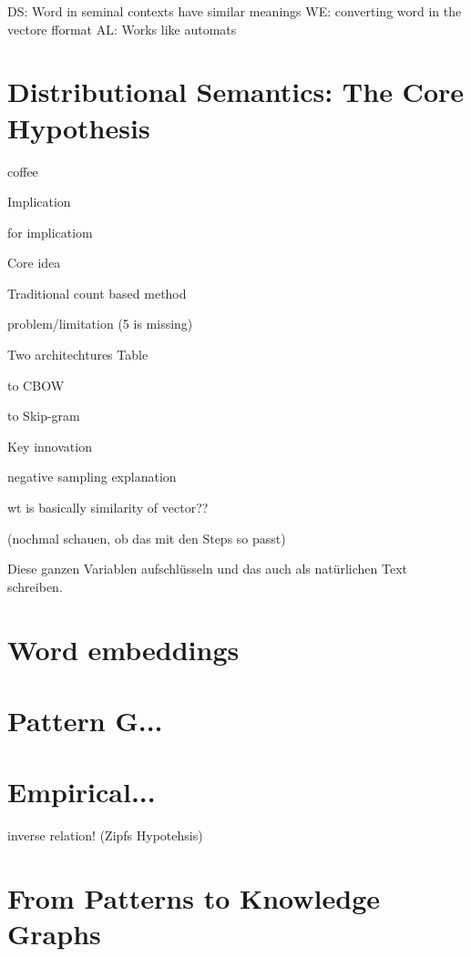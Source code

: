 
DS: Word in seminal contexts have similar meanings
WE: converting word in the vectore fformat
AL: Works like automats

\section{Distributional Semantics: The Core Hypothesis}


\begin{bsp}
    coffee
\end{bsp}

Implication
\begin{bsp}
    for implicatiom
\end{bsp}


Core idea

Traditional count based method

problem/limitation
(5 is missing)


Two architechtures Table

\begin{bsp}
    to CBOW
\end{bsp}

\begin{bsp}
    to Skip-gram
\end{bsp}


Key innovation

negative sampling explanation

wt is basically similarity of vector??

(nochmal schauen, ob das mit den Steps so passt)

Diese ganzen Variablen aufschlüsseln und das auch als natürlichen Text schreiben.
\section{Word embeddings}

\section{Pattern G...}

\section{Empirical...}
inverse relation! (Zipfs Hypotehsis)

\section{From Patterns to Knowledge Graphs}

\begin{table}[H]
    \caption{Compraison of three generations of representation learning}
\end{table}

